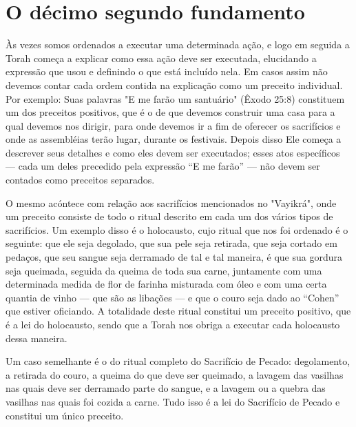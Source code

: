  
 
 
 



\chapter*{O décimo segundo fundamento}

Às vezes somos ordenados a executar uma determinada ação, e lo­go em
seguida a Torah começa a explicar como essa ação deve ser executada,
elucidando a expressão que usou e definindo o que está incluído nela. Em
casos assim não devemos contar cada ordem contida na explicação como um
preceito individual. Por exemplo: Suas palavras "E me farão um
santuário" (Êxodo 25:8) constituem um dos preceitos positivos, que é o
de que devemos construir uma casa para a qual devemos nos dirigir, para
onde devemos ir a fim de oferecer os sacrifícios e onde as assembléias
terão lugar, durante os festivais. Depois disso Ele começa a descrever
seus detalhes e como eles devem ser executados; esses atos específicos
--- cada um deles precedido pela expressão ``E me farão'' --- não devem
ser contados como preceitos separados.

O mesmo acóntece com relação aos sacrifícios mencionados no "Va­yikrá",
onde um preceito consiste de todo o ritual descrito em cada um dos
vários tipos de sacrifícios. Um exemplo disso é o holocausto, cujo
ritual que nos foi ordenado é o seguinte: que ele seja degolado, que sua
pele seja retirada, que seja cortado em pedaços, que seu sangue seja
derramado de tal e tal manei­ra, é que sua gordura seja queimada,
seguida da queima de toda sua carne, jun­tamente com uma determinada
medida de flor de farinha misturada com óleo e com uma certa quantia de
vinho --- que são as libações --- e que o couro seja dado ao ``Cohen'' que
estiver oficiando. A totalidade deste ritual constitui um preceito
positivo, que é a lei do holocausto, sendo que a Torah nos obriga a
executar cada holocausto dessa maneira.

Um caso semelhante é o do ritual completo do Sacrifício de Pecado:
degolamento, a retirada do couro, a queima do que deve ser queimado, a
lavagem das vasilhas nas quais deve ser derramado parte do sangue, e a
lava­gem ou a quebra das vasilhas nas quais foi cozida a carne. Tudo
isso é a lei do Sacrifício de Pecado e constitui um único preceito.

